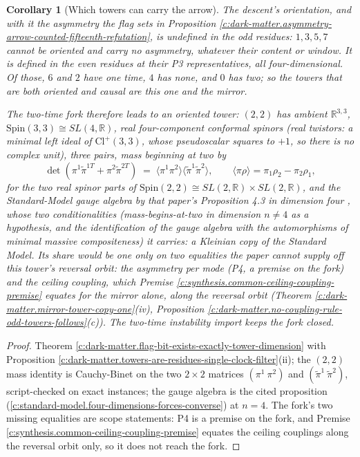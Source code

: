\documentclass[11pt]{article}
\newtheorem{corollary}[theorem]{Corollary}
\theoremstyle{definition}
\theoremstyle{plain}
\newcommand{\changedmark}[2]{\marginpar{\raggedright\scriptsize\color{#1}#2}}
\providecommand{\Cl}{}\renewcommand{\Cl}{\mathrm{Cl}}
\providecommand{\R}{}\renewcommand{\R}{\mathbb{R}}
\providecommand{\br}{}\renewcommand{\br}[1]{\langle #1\rangle}
\begin{document}
\begin{corollary}[Which towers can carry the arrow]\label{c:dark-matter.which-towers-can-carry-arrow}
\changedmark{BurntOrange}{changed since the deposit}
The descent's orientation, and with it the asymmetry the flag sets in Proposition \ref{c:dark-matter.asymmetry-arrow-counted-fifteenth-refutation}, is undefined in the odd residues: $1, 3, 5, 7$ cannot be oriented and carry no asymmetry, whatever their content or window. It is defined in the even residues at their P3 representatives, all four-dimensional. Of those, $6$ and $2$ have one time, $4$ has none, and $0$ has two; so the towers that are both oriented and causal are this one and the mirror.

The two-time fork therefore leads to an \emph{oriented} tower: $(2,2)$ has ambient $\R^{3,3}$, $\mathrm{Spin}(3,3) \cong SL(4,\R)$, real four-component conformal spinors (real twistors: a minimal left ideal of $\Cl^+(3,3)$, whose pseudoscalar squares to $+1$, so there is no complex unit), three pairs, mass beginning at two by
\[
\det(\pi^{1}\tilde\pi^{1T} + \pi^{2}\tilde\pi^{2T}) \;=\; \br{\pi^{1}\pi^{2}}\br{\tilde\pi^{1}\tilde\pi^{2}}, \qquad \br{\pi\rho} = \pi_{1}\rho_{2} - \pi_{2}\rho_{1},
\]
for the two real spinor parts of $\mathrm{Spin}(2,2) \cong SL(2,\R) \times SL(2,\R)$, and the Standard-Model gauge algebra by that paper's Proposition 4.3 in dimension four \cite[Prop.~4.3]{ButlerT12}, whose two conditionalities (mass-begins-at-two in dimension $n \neq 4$ as a hypothesis, and the identification of the gauge algebra with the automorphisms of minimal massive compositeness) it carries: a Kleinian copy of the Standard Model. Its share would be one only on two equalities the paper cannot supply off this tower's reversal orbit: the asymmetry per mode (P4, a premise on the fork) and the ceiling coupling, which Premise \ref{c:synthesis.common-ceiling-coupling-premise} equates for the mirror alone, along the reversal orbit (Theorem \ref{c:dark-matter.mirror-tower-copy-one}(iv), Proposition \ref{c:dark-matter.no-coupling-rule-odd-towers-follows}(c)). The two-time instability import keeps the fork closed.
\end{corollary}
\begin{proof}
Theorem \ref{c:dark-matter.flag-bit-exists-exactly-tower-dimension} with Proposition \ref{c:dark-matter.towers-are-residues-single-clock-filter}(ii); the $(2,2)$ mass identity is Cauchy-Binet on the two $2 \times 2$ matrices $(\pi^{1}\ \pi^{2})$ and $(\tilde\pi^{1}\ \tilde\pi^{2})$, script-checked on exact instances; the gauge algebra is the cited proposition (\ref{c:standard-model.four-dimensions-forces-converse}) at $n = 4$. The fork's two missing equalities are scope statements: P4 is a premise on the fork, and Premise \ref{c:synthesis.common-ceiling-coupling-premise} equates the ceiling couplings along the reversal orbit only, so it does not reach the fork.

\end{proof}
\end{document}
